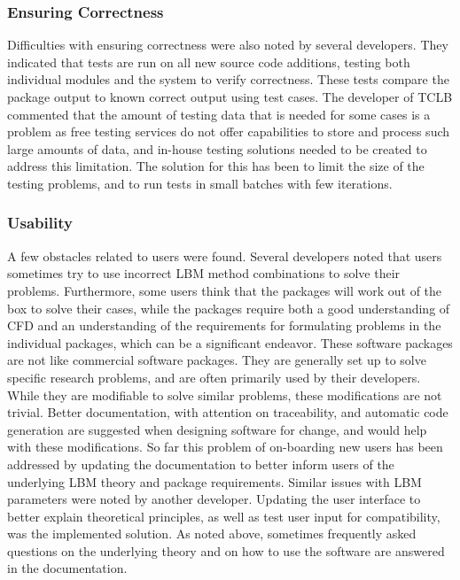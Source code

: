 \documentclass[final, 3p, times, authoryear]{elsarticle}
\begin{document}
\subsubsection{Ensuring Correctness}

Difficulties with ensuring correctness were also noted by several developers.
They indicated that tests are run on all new source code additions, testing both
individual modules and the system to verify correctness. These tests compare the
package output to known correct output using test cases. The developer of TCLB
commented that the amount of testing data that is needed for some cases is a
problem as free testing services do not offer capabilities to store and process
such large amounts of data, and in-house testing solutions needed to be created
to address this limitation. The solution for this has been to limit the size of
the testing problems, and to run tests in small batches with few iterations.

\subsubsection{Usability}

A few obstacles related to users were found. Several developers noted that users
sometimes try to use incorrect LBM method combinations to solve their problems.
Furthermore, some users think that the packages will work out of the box to
solve their cases, while the packages require both a good understanding of CFD
and an understanding of the requirements for formulating problems in the
individual packages, which can be a significant endeavor. These software
packages are not like commercial software packages. They are generally set up to
solve specific research problems, and are often primarily used by their
developers. While they are modifiable to solve similar problems, these
modifications are not trivial. Better documentation, with attention on
traceability, and automatic code generation are suggested when designing
software for change, and would help with these modifications. So far this
problem of on-boarding new users has been addressed by updating the
documentation to better inform users of the underlying LBM theory and package
requirements. Similar issues with LBM parameters were noted by another
developer. Updating the user interface to better explain theoretical principles,
as well as test user input for compatibility, was the implemented solution. As
noted above, sometimes frequently asked questions on the underlying theory and
on how to use the software are answered in the documentation.
\end{document}
